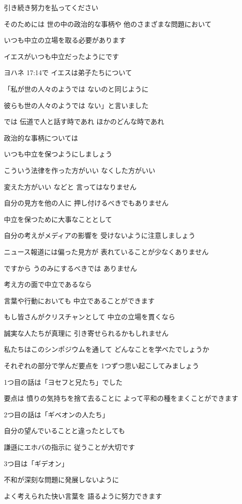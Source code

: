 \documentclass[twocolumn]{jsarticle}
\begin{document}
引き続き努力を払ってください

そのためには 世の中の政治的な事柄や
他のさまざまな問題において

いつも中立の立場を取る必要があります

イエスがいつも中立だったようにです

ヨハネ 17:14で
イエスは弟子たちについて

「私が世の人々のようでは
ないのと同じように

彼らも世の人々のようでは
ない」と言いました

では 伝道で人と話す時であれ
ほかのどんな時であれ

政治的な事柄については

いつも中立を保つようにしましょう

こういう法律を作った方がいい
なくした方がいい

変えた方がいい などと
言ってはなりません

自分の見方を他の人に
押し付けるべきでもありません

中立を保つために大事なこととして

自分の考えがメディアの影響を
受けないように注意しましょう

ニュース報道には偏った見方が
表れていることが少なくありません

ですから うのみにするべきでは
ありません

考え方の面で中立であるなら

言葉や行動においても
中立であることができます

もし皆さんがクリスチャンとして
中立の立場を貫くなら

誠実な人たちが真理に
引き寄せられるかもしれません

私たちはこのシンポジウムを通して
どんなことを学べたでしょうか

それぞれの部分で学んだ要点を
1つずつ思い起こしてみましょう

1つ目の話は「ヨセフと兄たち」でした

要点は 憤りの気持ちを捨て去ることに
よって平和の種をまくことができます

2つ目の話は「ギベオンの人たち」

自分の望んでいることと違ったとしても

謙遜にエホバの指示に
従うことが大切です

3つ目は「ギデオン」

不和が深刻な問題に発展しないように

よく考えられた快い言葉を
語るように努力できます
\end{document}
